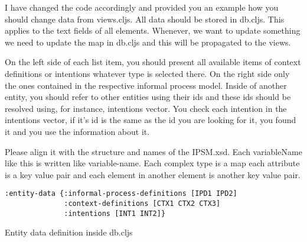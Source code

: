 I have changed the code accordingly and provided you an example how you should change data from views.cljs. All data should be stored in db.cljs. This applies to the text fields of all elements. Whenever, we want to update something we need to update the map in db.cljs and this will be propagated to the views.


On the left side of each list item, you should present all available items of context definitions or intentions whatever type is selected there. On the right side only the ones contained in the respective informal process model. Inside of another entity, you should refer to other entities using their ids and these ids should be resolved using, for instance, intentions vector. You check each intention in the intentions vector, if it’s id is the same as the id you are looking for it, you found it and you use the information about it.  


Please align it with the structure and names of the IPSM.xsd. Each variableName like this is written like variable-name. Each complex type is a map each attribute is a key value pair and each element in another element is another key value pair.

\begin{Listing}
	\begin{lstlisting}
:entity-data {:informal-process-definitions [IPD1 IPD2]
	          :context-definitions [CTX1 CTX2 CTX3]
	          :intentions [INT1 INT2]} 
	\end{lstlisting}
	\caption{Entity data definition inside db.cljs}
	\label{lst:entitydatalist}
\end{Listing}

